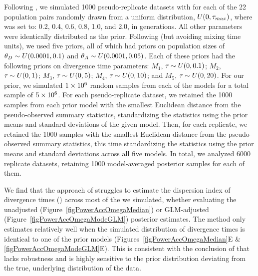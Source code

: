 \documentclass[letterpaper,12pt]{article}
\begin{document}
\begin{linenumbers}
Following \citet{Oaks2012}, we simulated 1000 pseudo-replicate datasets with
\divt{} for each of the 22 population pairs randomly drawn from a uniform
distribution, $U(0, \tau_{max})$, where  was set to: 0.2, 0.4, 0.6,
0.8, 1.0, and 2.0, in \globalcoalunit generations.
All other parameters were identically distributed as the prior.
Following \citet{Hickerson2013} (but avoiding mixing time units), we used five
priors, all of which had priors on population sizes of $\meanDescendantTheta{}
\sim U(0.0001, 0.1)$ and $\ancestralTheta{} \sim U(0.0001, 0.05)$.
Each of these priors had the following priors on divergence time parameters:
$M_1$, $\tau_{} \sim U(0, 0.1)$;
$M_2$, $\tau_{} \sim U(0, 1)$;
$M_3$, $\tau_{} \sim U(0, 5)$;
$M_4$, $\tau_{} \sim U(0, 10)$; and
$M_5$, $\tau_{} \sim U(0, 20)$.
For our prior, we simulated $1\times 10^{6}$ random samples from each of the models
for a total sample of $5\times 10^{6}$.
For each pseudo-replicate dataset, we retained the 1000 samples from each prior
model with the smallest Euclidean distance from the pseudo-observed summary
statistics, standardizing the statistics using the prior means and standard
deviations of the given model.
Then, for each replicate, we retained the 1000 samples with the smallest
Euclidean distance from the pseudo-observed summary statistics, this time
standardizing the statistics using the prior means and standard deviations
across all five models.
In total, we analyzed 6000 replicate datasets, retaining 1000 model-averaged
posterior samples for each of them.

We find that the approach of \citet{Hickerson2013} struggles to estimate the
dispersion index of divergence times (\vmratio{}) across most of the 
we simulated, whether evaluating the unadjusted
(Figure~\ref{figPowerAccOmegaMedian}) or GLM-adjusted
(Figure~\ref{figPowerAccOmegaModeGLM}) posterior estimates.
The method only estimates \vmratio{} relatively well when the simulated
distribution of divergence times is identical to one of the prior models
(Figures~\ref{figPowerAccOmegaMedian}E \& \ref{figPowerAccOmegaModeGLM}E).
This is consistent with the conclusion of \citet{Oaks2012} that \msb lacks
robustness and is highly sensitive to the prior distribution deviating from the
true, underlying distribution of the data.


\end{linenumbers}
\end{document}
